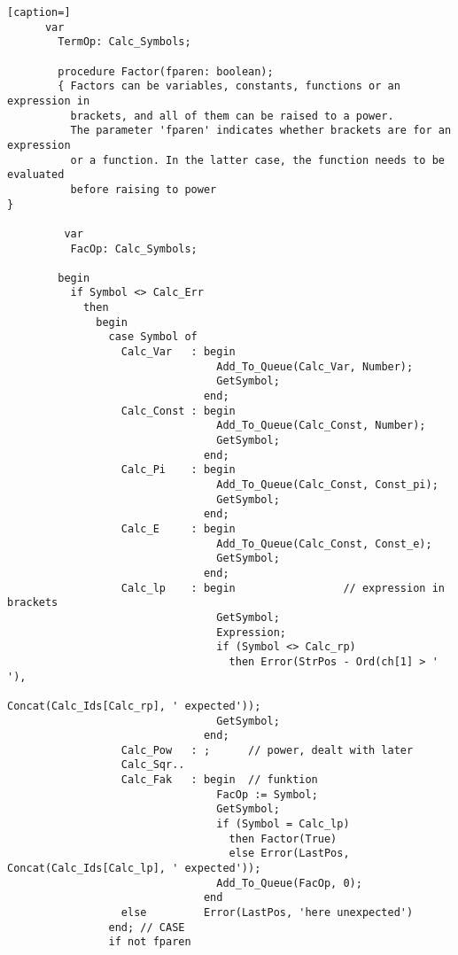 \begin{refsection}
\begin{lstlisting}[caption=]
      var
        TermOp: Calc_Symbols;

        procedure Factor(fparen: boolean);
        { Factors can be variables, constants, functions or an expression in
          brackets, and all of them can be raised to a power.
          The parameter 'fparen' indicates whether brackets are for an expression
          or a function. In the latter case, the function needs to be evaluated
          before raising to power                                                }

         var
          FacOp: Calc_Symbols;

        begin
          if Symbol <> Calc_Err
            then
              begin
                case Symbol of
                  Calc_Var   : begin
                                 Add_To_Queue(Calc_Var, Number);
                                 GetSymbol;
                               end;
                  Calc_Const : begin
                                 Add_To_Queue(Calc_Const, Number);
                                 GetSymbol;
                               end;
                  Calc_Pi    : begin
                                 Add_To_Queue(Calc_Const, Const_pi);
                                 GetSymbol;
                               end;
                  Calc_E     : begin
                                 Add_To_Queue(Calc_Const, Const_e);
                                 GetSymbol;
                               end;
                  Calc_lp    : begin                 // expression in brackets
                                 GetSymbol;
                                 Expression;
                                 if (Symbol <> Calc_rp)
                                   then Error(StrPos - Ord(ch[1] > ' '),
                                              Concat(Calc_Ids[Calc_rp], ' expected'));
                                 GetSymbol;
                               end;
                  Calc_Pow   : ;      // power, dealt with later
                  Calc_Sqr..
                  Calc_Fak   : begin  // funktion
                                 FacOp := Symbol;
                                 GetSymbol;
                                 if (Symbol = Calc_lp)
                                   then Factor(True)
                                   else Error(LastPos, Concat(Calc_Ids[Calc_lp], ' expected'));
                                 Add_To_Queue(FacOp, 0);
                               end
                  else         Error(LastPos, 'here unexpected')
                end; // CASE
                if not fparen

\end{lstlisting}
\end{refsection}
